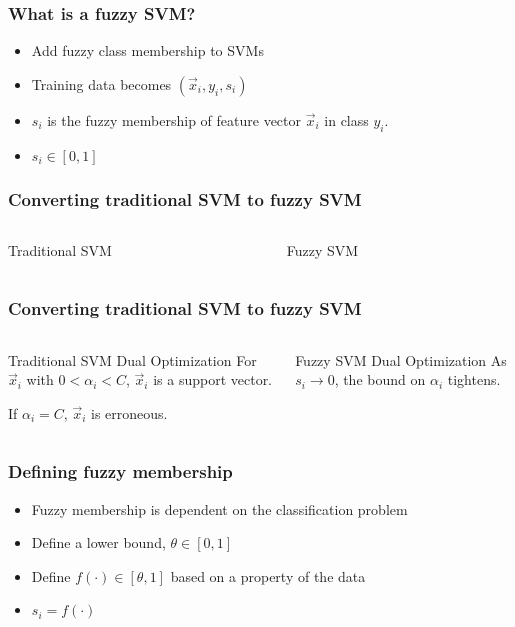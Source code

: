 
\begin{frame}
    \frametitle{What is a fuzzy SVM? \cite{991432}}
    \begin{itemize}
        \item Add fuzzy class membership to SVMs
        \item Training data becomes \(\left(\vec{x}_i, y_i, s_i\right)\)
        \item \(s_i\) is the fuzzy membership of feature vector \(\vec{x}_i\) in class \(y_i\).
        \item \(s_i \in [0, 1]\)
    \end{itemize}
\end{frame}

\begin{frame}
    \frametitle{Converting traditional SVM to fuzzy SVM}
    \begin{columns}[T]
        \begin{column}{0.5\textwidth}
            Traditional SVM
            \svmEquation
        \end{column}
        \begin{column}{0.5\textwidth}
            Fuzzy SVM
            \fuzzySvmEquation
        \end{column}
    \end{columns}
\end{frame}

\begin{frame}
    \frametitle{Converting traditional SVM to fuzzy SVM}
    \begin{columns}[T]
        \begin{column}{0.5\textwidth}
            Traditional SVM Dual Optimization
            \traditionalDual
            For \(\vec{x}_i\) with \(0 < \alpha_i < C\), \(\vec{x}_i\) is a support vector.

            If \(\alpha_i = C\), \(\vec{x}_i\) is erroneous.
        \end{column}
        \begin{column}{0.5\textwidth}
            Fuzzy SVM Dual Optimization
            \fuzzyDual
            As \(s_i \to 0\), the bound on \(\alpha_i\) tightens.
        \end{column}
    \end{columns}
\end{frame}

\begin{frame}
    \frametitle{Defining fuzzy membership}
    \begin{itemize}
        \item Fuzzy membership is dependent on the classification problem
        \item Define a lower bound, \(\theta \in [0, 1]\)
        \item Define \(f(\cdot) \in [\theta, 1]\) based on a property of the data
        \item \(s_i = f(\cdot)\)
    \end{itemize}
\end{frame}
